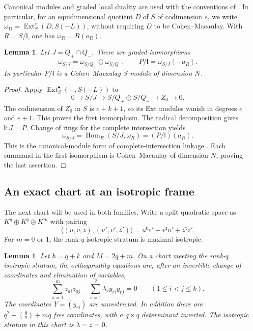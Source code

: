 \documentclass[11pt]{article}
\newtheorem{lemma}[theorem]{Lemma}
\theoremstyle{definition}
\theoremstyle{remark}
\numberwithin{equation}{section}
\DeclareMathOperator{\Hom}{Hom}
\DeclareMathOperator{\Ext}{Ext}
\newcommand{\II}{\mathsf I}
\begin{document}
Canonical modules and graded local duality are used with the conventions
of \cite{BH}. In particular, for an equidimensional quotient $D$ of
$S$ of codimension $e$, we write
$\omega_D=\Ext^e_S(D,S(-L))$, without requiring $D$ to be
Cohen--Macaulay. With $R=S/\II$, one has $\omega_R=R(a_R)$.

\begin{lemma}\label{lem:linkage-canonical}
Let $J=Q_+\cap Q_-$. There are graded isomorphisms
\begin{equation}\label{eq:canonical-linkage}
 \omega_{S/J}=\omega_{S/Q_+}\oplus\omega_{S/Q_-},\qquad
 P/\II=\omega_{S/J}(-a_R).
\end{equation}
In particular $P/\II$ is a Cohen--Macaulay $S$-module of dimension $N$.
\end{lemma}

\begin{proof}
Apply $\Ext_S^\bullet(-,S(-L))$ to
\begin{equation}\label{eq:union}
 0\longrightarrow S/J\longrightarrow
 S/Q_+\oplus S/Q_-\longrightarrow Z_0\longrightarrow0.
\end{equation}
The codimension of $Z_0$ in $S$ is $e+k+1$, so its Ext modules
vanish in degrees $e$ and $e+1$. This proves the first isomorphism.
The radical decomposition gives $\II:J=P$. Change of rings for the
complete intersection yields
\[
 \omega_{S/J}=\Hom_R(S/J,\omega_R)=(P/\II)(a_R).
\]
This is the canonical-module form of complete-intersection linkage
\cite{PS}. Each summand in the first isomorphism is Cohen--Macaulay
of dimension $N$, proving the last assertion.
\end{proof}

\subsection{An exact chart at an isotropic frame}

The next chart will be used in both families. Write a split quadratic
space as $K^q\oplus K^q\oplus K^m$ with pairing
\[
 \langle(u,v,z),(u',v',z')\rangle
 =u^{\mathsf t}v'+v^{\mathsf t}u'+z^{\mathsf t}z'.
\]
For $m=0$ or $1$, the rank-$q$ isotropic stratum is maximal isotropic.

\begin{lemma}\label{lem:chart}
Let $h=q+k$ and $M=2q+m$. On a chart meeting the rank-$q$ isotropic
stratum, the orthogonality equations are, after an invertible change
of coordinates and elimination of variables,
\begin{equation}\label{eq:chart}
 \sum_{a=1}^m z_{ai}z_{aj}
 -\sum_{r=1}^q\lambda_r y_{ri}y_{rj}=0
 \qquad(1\leq i<j\leq k).
\end{equation}
The coordinates $Y=(y_{ri})$ are unrestricted. In addition there are
$q^2+\binom q2+mq$ free coordinates, with a $q\times q$ determinant
inverted. The isotropic stratum in this chart is $\lambda=z=0$.
\end{lemma}
\end{document}

